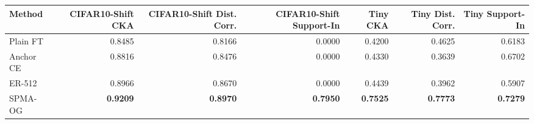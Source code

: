 \begin{tabular}{lrrrrrr}
\toprule
Method & CIFAR10-Shift CKA & CIFAR10-Shift Dist. Corr. & CIFAR10-Shift Support-In & Tiny CKA & Tiny Dist. Corr. & Tiny Support-In\\
\midrule
Plain FT & 0.8485 & 0.8166 & 0.0000 & 0.4200 & 0.4625 & 0.6183\\
Anchor CE & 0.8816 & 0.8476 & 0.0000 & 0.4330 & 0.3639 & 0.6702\\
ER-512 & 0.8966 & 0.8670 & 0.0000 & 0.4439 & 0.3962 & 0.5907\\
SPMA-OG & \textbf{0.9209} & \textbf{0.8970} & \textbf{0.7950} & \textbf{0.7525} & \textbf{0.7773} & \textbf{0.7279}\\
\bottomrule
\end{tabular}
